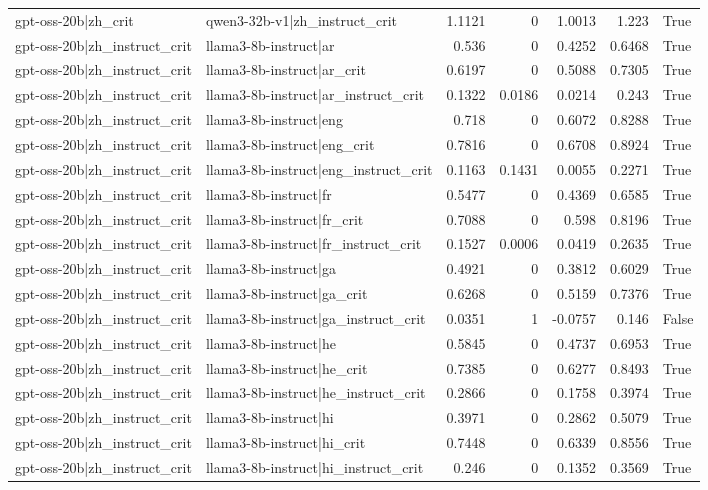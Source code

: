 \begin{table}
\begin{tabular}{l l r r r r l}
gpt-oss-20b|zh_crit & qwen3-32b-v1|zh_instruct_crit & 1.1121 & 0 & 1.0013 & 1.223 & True \\
gpt-oss-20b|zh_instruct_crit & llama3-8b-instruct|ar & 0.536 & 0 & 0.4252 & 0.6468 & True \\
gpt-oss-20b|zh_instruct_crit & llama3-8b-instruct|ar_crit & 0.6197 & 0 & 0.5088 & 0.7305 & True \\
gpt-oss-20b|zh_instruct_crit & llama3-8b-instruct|ar_instruct_crit & 0.1322 & 0.0186 & 0.0214 & 0.243 & True \\
gpt-oss-20b|zh_instruct_crit & llama3-8b-instruct|eng & 0.718 & 0 & 0.6072 & 0.8288 & True \\
gpt-oss-20b|zh_instruct_crit & llama3-8b-instruct|eng_crit & 0.7816 & 0 & 0.6708 & 0.8924 & True \\
gpt-oss-20b|zh_instruct_crit & llama3-8b-instruct|eng_instruct_crit & 0.1163 & 0.1431 & 0.0055 & 0.2271 & True \\
gpt-oss-20b|zh_instruct_crit & llama3-8b-instruct|fr & 0.5477 & 0 & 0.4369 & 0.6585 & True \\
gpt-oss-20b|zh_instruct_crit & llama3-8b-instruct|fr_crit & 0.7088 & 0 & 0.598 & 0.8196 & True \\
gpt-oss-20b|zh_instruct_crit & llama3-8b-instruct|fr_instruct_crit & 0.1527 & 0.0006 & 0.0419 & 0.2635 & True \\
gpt-oss-20b|zh_instruct_crit & llama3-8b-instruct|ga & 0.4921 & 0 & 0.3812 & 0.6029 & True \\
gpt-oss-20b|zh_instruct_crit & llama3-8b-instruct|ga_crit & 0.6268 & 0 & 0.5159 & 0.7376 & True \\
gpt-oss-20b|zh_instruct_crit & llama3-8b-instruct|ga_instruct_crit & 0.0351 & 1 & -0.0757 & 0.146 & False \\
gpt-oss-20b|zh_instruct_crit & llama3-8b-instruct|he & 0.5845 & 0 & 0.4737 & 0.6953 & True \\
gpt-oss-20b|zh_instruct_crit & llama3-8b-instruct|he_crit & 0.7385 & 0 & 0.6277 & 0.8493 & True \\
gpt-oss-20b|zh_instruct_crit & llama3-8b-instruct|he_instruct_crit & 0.2866 & 0 & 0.1758 & 0.3974 & True \\
gpt-oss-20b|zh_instruct_crit & llama3-8b-instruct|hi & 0.3971 & 0 & 0.2862 & 0.5079 & True \\
gpt-oss-20b|zh_instruct_crit & llama3-8b-instruct|hi_crit & 0.7448 & 0 & 0.6339 & 0.8556 & True \\
gpt-oss-20b|zh_instruct_crit & llama3-8b-instruct|hi_instruct_crit & 0.246 & 0 & 0.1352 & 0.3569 & True \\

\end{tabular}
\end{table}
